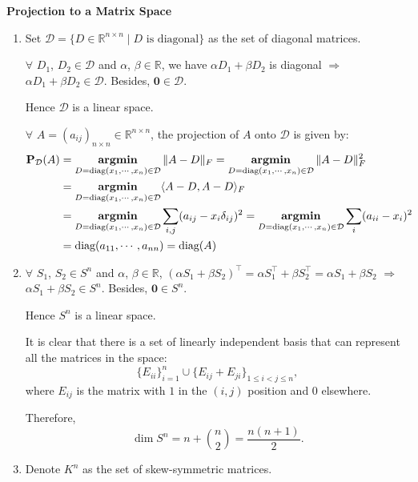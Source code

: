 \documentclass[11pt,letter,notitlepage]{article}
\DeclareMathOperator*{\argmin}{\bf argmin}
\begin{document}
\begin{solution} \textbf{Projection to a Matrix Space}
\begin{enumerate}
    \item
	Set $\mathcal{D} = \{D \in \mathbb{R}^{n \times n} \mid D \text{ is diagonal}\}$ as the set of diagonal matrices. 
	
	$\forall$ $D_1$, $D_2\in \mathcal{D}$ and $\alpha$, $\beta\in \mathbb{R}$, we have $\alpha D_1 + \beta D_2$ is diagonal $\Longrightarrow$ $\alpha D_1 + \beta D_2 \in \mathcal{D}$. Besides, $\mathbf{0} \in \mathcal{D}$.

	Hence $\mathcal{D}$ is a linear space.

	$\forall$ $A = (a_{ij})_{n\times n} \in \mathbb{R}^{n \times n}$, the projection of $A$ onto $\mathcal{D}$ is given by:
	\begin{align*}
	\mathbf{P}_{\mathcal{D}}(A)
	&=
	\argmin_{D = \text{diag}(x_1, \cdots, x_n) \in \mathcal{D}} \|A - D\|_F
	=
	\argmin_{D = \text{diag}(x_1, \cdots, x_n) \in \mathcal{D}} \|A - D\|_F^2\\
	&=
	\argmin_{D = \text{diag}(x_1, \cdots, x_n) \in \mathcal{D}} \langle A - D, A - D \rangle_F\\
	&=
	\argmin_{D = \text{diag}(x_1, \cdots, x_n) \in \mathcal{D}} \sum_{i,j} (a_{ij} - x_i \delta_{ij})^2
	=
	\argmin_{D = \text{diag}(x_1, \cdots, x_n) \in \mathcal{D}} \sum_{i} (a_{ii} - x_i)^2\\
	&=
	\text{diag}(a_{11}, \cdots, a_{nn})
	=
	\text{diag}(A)
	\end{align*}
	\item 
	$\forall$ $S_1$, $S_2\in S^n$ and $\alpha$, $\beta\in \mathbb{R}$, $(\alpha S_1 + \beta S_2)^\top = \alpha S_1^\top + \beta S_2^\top = \alpha S_1 + \beta S_2$ $\Longrightarrow$ $\alpha S_1 +\beta S_2 \in S^n$. Besides, $\mathbf{0} \in S^n$.

	Hence $S^n$ is a linear space.

	It is clear that there is a set of linearly independent basis that can represent all the matrices in the space:
	\[
	\{E_{ii}\}_{i=1}^{n} \cup \{E_{ij} + E_{ji}\}_{1 \leq i < j \leq n},
	\]
	where $E_{ij}$ is the matrix with $1$ in the $(i,j)$ position and $0$ elsewhere. 
	
	Therefore, 
	\[
	\dim S^n = n + \binom{n}{2} = \frac{n(n+1)}{2}.
	\]
	\item 
	Denote $K^n$ as the set of skew-symmetric matrices.
	

\end{enumerate}
\end{solution}
\end{document}
